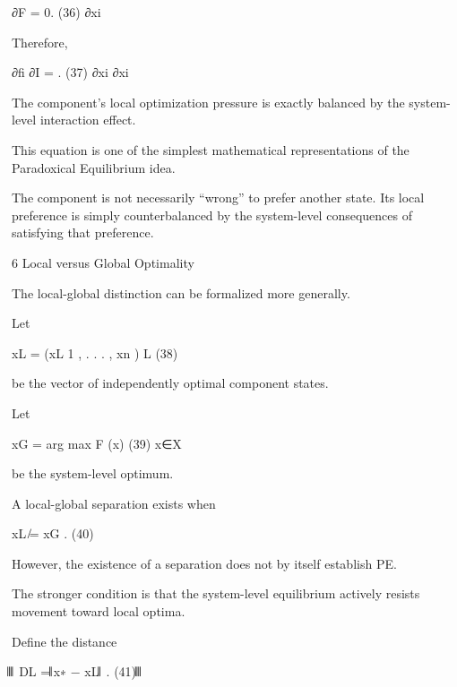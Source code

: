 \documentclass[10pt,a4paper]{article}
\begin{document}
\begin{ManuscriptText}
                                              ∂F
                                                  = 0.                                      (36)
                                              ∂xi

Therefore,

                                            ∂fi   ∂I
                                                =     .                                     (37)
                                            ∂xi   ∂xi

The component’s local optimization pressure is exactly balanced by the system-level interaction
effect.

This equation is one of the simplest mathematical representations of the Paradoxical Equilibrium
idea.

The component is not necessarily “wrong” to prefer another state. Its local preference is simply
counterbalanced by the system-level consequences of satisfying that preference.


6       Local versus Global Optimality

The local-global distinction can be formalized more generally.

Let


                                        xL = (xL
                                               1 , . . . , xn )
                                                            L
                                                                                            (38)

be the vector of independently optimal component states.

Let


                                        xG = arg max F (x)                                  (39)
                                                   x∈X

be the system-level optimum.

A local-global separation exists when


                                           xL ̸= xG .                                     (40)

However, the existence of a separation does not by itself establish PE.

The stronger condition is that the system-level equilibrium actively resists movement toward
local optima.

Define the distance

                                                ⃦        ⃦
                                       DL = ⃦x∗ − xL ⃦ .                                  (41)
                                                ⃦        ⃦



\end{ManuscriptText}
\end{document}
